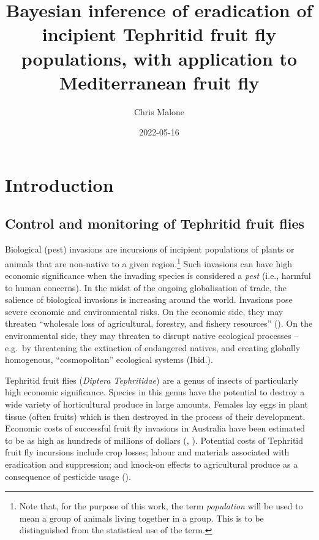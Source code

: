 \documentclass[
  oneside]{book}
\title{Bayesian inference of eradication of incipient Tephritid fruit fly populations, with application to Mediterranean fruit fly}
\author{Chris Malone}
\date{2022-05-16}
\begin{document}
\maketitle

\renewcommand{\baselinestretch}{1}\normalsize
\tableofcontents
\renewcommand{\baselinestretch}{2}\normalsize

\hypertarget{introduction}{%
\chapter{Introduction}\label{introduction}}

\hypertarget{control-and-monitoring-of-tephritid-fruit-flies}{%
\section{Control and monitoring of Tephritid fruit flies}\label{control-and-monitoring-of-tephritid-fruit-flies}}

Biological (pest) invasions are incursions of incipient populations of plants or animals that are non-native to a given region.\footnote{Note that, for the purpose of this work, the term \emph{population} will be used to mean a group of animals living together in a group. This is to be distinguished from the statistical use of the term.} Such invasions can have high economic significance when the invading species is considered a \emph{pest} (i.e., harmful to human concerns). In the midst of the ongoing globalisation of trade, the salience of biological invasions is increasing around the world. Invasions pose severe economic and environmental risks. On the economic side, they may threaten ``wholesale loss of agricultural, forestry, and fishery resources'' (\citet{mack2000}). On the environmental side, they may threaten to disrupt native ecological processes -- e.g.~by threatening the extinction of endangered natives, and creating globally homogenous, ``cosmopolitan'' ecological systems (Ibid.).

Tephritid fruit flies (\emph{Diptera Tephritidae}) are a genus of insects of particularly high economic significance. Species in this genus have the potential to destroy a wide variety of horticultural produce in large amounts. Females lay eggs in plant tissue (often fruits) which is then destroyed in the process of their development. Economic costs of successful fruit fly invasions in Australia have been estimated to be as high as hundreds of millions of dollars (\citet{suckling2016}, \citet{hancock2000}). Potential costs of Tephritid fruit fly incursions include crop losses; labour and materials associated with eradication and suppression; and knock-on effects to agricultural produce as a consequence of pesticide usage (\citet{suckling2016}).
\end{document}
